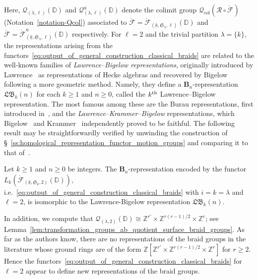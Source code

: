 \documentclass[AHL,Unicode,published]{cedram}
\newcommand{\Int}{\mathring}
\newcommand{\col}{\mathrm{col}}
\newcommand{\unt}{\mathrm{u}}
\newcommand{\B}{\ensuremath{\mathbf{B}}}
\newcommand{\Sym}{\mathfrak{S}}
\newcommand{\LB}{\mathfrak{LB}}
\newcommand{\sR}{\mathscr{R}}
\newcommand{\cF}{\mathcal{F}}
\newcommand{\cQ}{\mathcal{Q}}
\newcommand{\bD}{\mathbb{D}}
\newcommand{\bZ}{\mathbb{Z}}
\renewcommand{\geq}{\geqslant}
\begin{document}
Here, $\cQ_{(\lambda,\ell)}(\bD)$ and $\cQ^{\unt}_{(\lambda,\ell)}(\bD)$ denote the colimit group $\cQ_{\col}(\sR \circ \Int{\cF})$ (Notation~\ref{notation-Qcol}) associated to $\Int{\cF} = \Int{\cF}_{(\underline{k},\Sym_{\lambda},\ell)}(\bD)$ and $\Int{\cF} = \Int{\cF}^{\unt}_{(\underline{k},\Sym_{\lambda},\ell)}(\bD)$ respectively. For $\ell = 2$ and the trivial partition $\lambda = \boldsymbol{\{} k \boldsymbol{\}}$, the representations arising from the functors~\eqref{eq:output_of_general_construction_classical_braids} are related to the well-known families of \emph{Lawrence--Bigelow representations}, originally introduced by Lawrence~\cite{Lawrence1} as representations of Hecke algebras and recovered by Bigelow~\cite[\S~2]{bigelow2001braid} following a more geometric method. Namely, they define a $\B_{n}$-representation $\LB_{k}(n)$ for each $k\geq 1$ and $n\geq 0$, called the $k^{\rm th}$ Lawrence--Bigelow representation. The most famous among these are the Burau representations, first introduced in~\cite{burau}, and the \emph{Lawrence--Krammer--Bigelow} representations, which Bigelow~\cite[Th.~1.1]{bigelow2001braid} and Krammer~\cite{KrammerLK} independently proved to be faithful. The following result may be straightforwardly verified by unwinding the construction of \S~\ref{ss:homological_representation_functor_motion_groups} and comparing it to that of~\cite[\S~2]{bigelow2001braid}.

\begin{theo}\label{thm:LawrenceBigelowFunctors}
Let $k\geq 1$ and $n\geq 0$ be integers. The $\B_{n}$-representation encoded by the functor $L_{k}(\Int{\cF}_{(\underline{k},\Sym_{k},2)}(\bD))$, i.e.~\eqref{eq:output_of_general_construction_classical_braids} with $i=k=\lambda$ and $\ell = 2$, is isomorphic to the Lawrence-Bigelow representation $\LB_{k}(n)$.
\end{theo}

In addition, we compute that $\cQ_{(\lambda,2)}(\bD) \cong \bZ^{r'} \times \bZ^{r(r-1)/2} \times \bZ^{r}$; see Lemma~\ref{lem:transformation_groups_ab_quotient_surface_braid_groups}. As far as the authors know, there are no representations of the braid groups in the literature whose ground rings are of the form $\bZ[\bZ^{r'} \times \bZ^{r(r-1)/2} \times \bZ^{r}]$ for $r\geq 2$. Hence the functors~\eqref{eq:output_of_general_construction_classical_braids} for $\ell = 2$ appear to define new representations of the braid groups.
\end{document}
